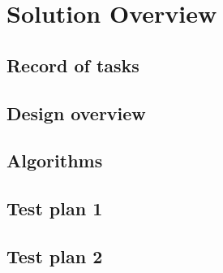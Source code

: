 \chapter{Solution Overview}
\section{Record of tasks}
\section{Design overview}
\section{Algorithms}
\section{Test plan 1}
\section{Test plan 2}
